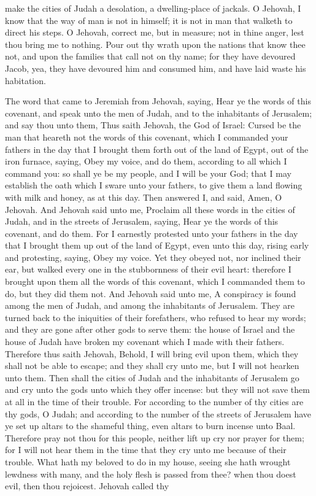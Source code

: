 make the cities of Judah a desolation, a dwelling-place of jackals.  O Jehovah, I know that the way of man is not in himself; it is not in man that walketh to direct his steps. O Jehovah, correct me, but in measure; not in thine anger, lest thou bring me to nothing. Pour out thy wrath upon the nations that know thee not, and upon the families that call not on thy name; for they have devoured Jacob, yea, they have devoured him and consumed him, and have laid waste his habitation. 

The word that came to Jeremiah from Jehovah, saying, Hear ye the words of this covenant, and speak unto the men of Judah, and to the inhabitants of Jerusalem; and say thou unto them, Thus saith Jehovah, the God of Israel: Cursed be the man that heareth not the words of this covenant, which I commanded your fathers in the day that I brought them forth out of the land of Egypt, out of the iron furnace, saying, Obey my voice, and do them, according to all which I command you: so shall ye be my people, and I will be your God; that I may establish the oath which I sware unto your fathers, to give them a land flowing with milk and honey, as at this day. Then answered I, and said, Amen, O Jehovah.  And Jehovah said unto me, Proclaim all these words in the cities of Judah, and in the streets of Jerusalem, saying, Hear ye the words of this covenant, and do them. For I earnestly protested unto your fathers in the day that I brought them up out of the land of Egypt, even unto this day, rising early and protesting, saying, Obey my voice. Yet they obeyed not, nor inclined their ear, but walked every one in the stubbornness of their evil heart: therefore I brought upon them all the words of this covenant, which I commanded them to do, but they did them not.  And Jehovah said unto me, A conspiracy is found among the men of Judah, and among the inhabitants of Jerusalem. They are turned back to the iniquities of their forefathers, who refused to hear my words; and they are gone after other gods to serve them: the house of Israel and the house of Judah have broken my covenant which I made with their fathers. Therefore thus saith Jehovah, Behold, I will bring evil upon them, which they shall not be able to escape; and they shall cry unto me, but I will not hearken unto them. Then shall the cities of Judah and the inhabitants of Jerusalem go and cry unto the gods unto which they offer incense: but they will not save them at all in the time of their trouble. For according to the number of thy cities are thy gods, O Judah; and according to the number of the streets of Jerusalem have ye set up altars to the shameful thing, even altars to burn incense unto Baal.  Therefore pray not thou for this people, neither lift up cry nor prayer for them; for I will not hear them in the time that they cry unto me because of their trouble. What hath my beloved to do in my house, seeing she hath wrought lewdness with many, and the holy flesh is passed from thee? when thou doest evil, then thou rejoicest. Jehovah called thy 